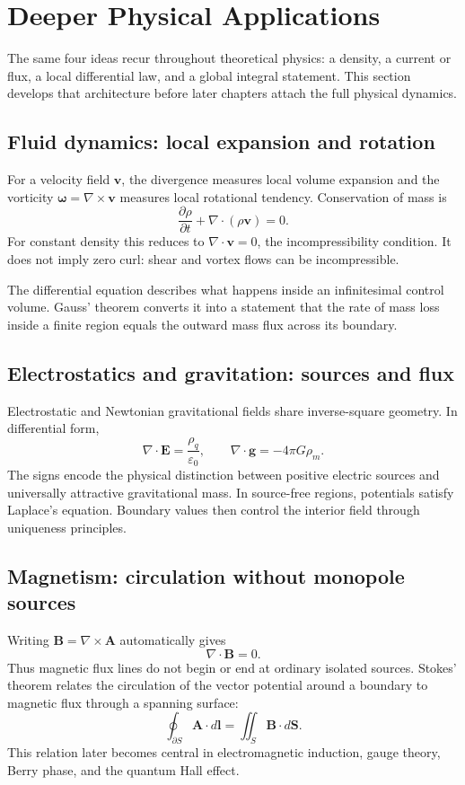 \section{Deeper Physical Applications}
\label{sec:ch3-physical-applications}

The same four ideas recur throughout theoretical physics: a density, a current or flux, a local differential law, and a global integral statement. This section develops that architecture before later chapters attach the full physical dynamics.

\subsection{Fluid dynamics: local expansion and rotation}
For a velocity field $\mathbf v$, the divergence measures local volume expansion and the vorticity $\boldsymbol\omega=\nabla\times\mathbf v$ measures local rotational tendency. Conservation of mass is
\[
\frac{\partial\rho}{\partial t}+\nabla\cdot(\rho\mathbf v)=0.
\]
For constant density this reduces to $\nabla\cdot\mathbf v=0$, the incompressibility condition. It does not imply zero curl: shear and vortex flows can be incompressible.

\begin{physical}
The differential equation describes what happens inside an infinitesimal control volume. Gauss' theorem converts it into a statement that the rate of mass loss inside a finite region equals the outward mass flux across its boundary.
\end{physical}

\subsection{Electrostatics and gravitation: sources and flux}
Electrostatic and Newtonian gravitational fields share inverse-square geometry. In differential form,
\[
\nabla\cdot\mathbf E=\frac{\rho_q}{\varepsilon_0},
\qquad
\nabla\cdot\mathbf g=-4\pi G\rho_m.
\]
The signs encode the physical distinction between positive electric sources and universally attractive gravitational mass. In source-free regions, potentials satisfy Laplace's equation. Boundary values then control the interior field through uniqueness principles.

\subsection{Magnetism: circulation without monopole sources}
Writing $\mathbf B=\nabla\times\mathbf A$ automatically gives
\[
\nabla\cdot\mathbf B=0.
\]
Thus magnetic flux lines do not begin or end at ordinary isolated sources. Stokes' theorem relates the circulation of the vector potential around a boundary to magnetic flux through a spanning surface:
\[
\oint_{\partial S}\mathbf A\cdot d\mathbf l=\iint_S\mathbf B\cdot d\mathbf S.
\]
This relation later becomes central in electromagnetic induction, gauge theory, Berry phase, and the quantum Hall effect.

